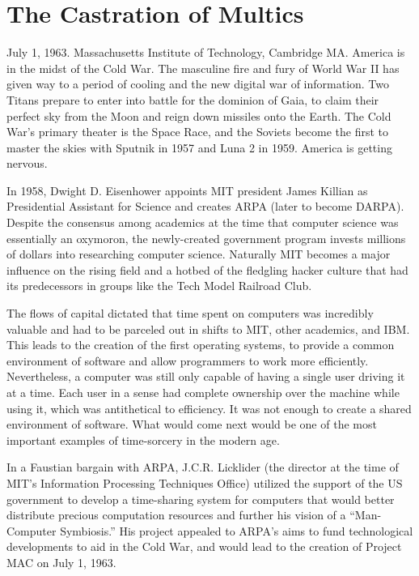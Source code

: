 \documentclass[10pt, statementpaper, twoside, openright]{memoir}
\begin{document}
\frontmatter
\pagestyle{simple}

\tableofcontents*

\mainmatter

\chapter{The Castration of Multics}

July 1, 1963. Massachusetts Institute of Technology, Cambridge MA. America is in the midst of the Cold War. The masculine fire and fury of World War II has given way to a period of cooling and the new digital war of information. Two Titans prepare to enter into battle for the dominion of Gaia, to claim their perfect sky from the Moon and reign down missiles onto the Earth. The Cold War's primary theater is the Space Race, and the Soviets become the first to master the skies with Sputnik in 1957 and Luna 2 in 1959. America is getting nervous.

In 1958, Dwight D. Eisenhower appoints MIT president James Killian as Presidential Assistant for Science and creates ARPA (later to become DARPA). Despite the consensus among academics at the time that computer science was essentially an oxymoron, the newly-created government program invests millions of dollars into researching computer science. Naturally MIT becomes a major influence on the rising field and a hotbed of the fledgling hacker culture that had its predecessors in groups like the Tech Model Railroad Club.

The flows of capital dictated that time spent on computers was incredibly valuable and had to be parceled out in shifts to MIT, other academics, and IBM. This leads to the creation of the first operating systems, to provide a common environment of software and allow programmers to work more efficiently. Nevertheless, a computer was still only capable of having a single user driving it at a time. Each user in a sense had complete ownership over the machine while using it, which was antithetical to efficiency. It was not enough to create a shared environment of software. What would come next would be one of the most important examples of time-sorcery in the modern age.

In a Faustian bargain with ARPA, J.C.R. Licklider (the director at the time of MIT's Information Processing Techniques Office) utilized the support of the US government to develop a time-sharing system for computers that would better distribute precious computation resources and further his vision of a ``Man-Computer Symbiosis.'' His project appealed to ARPA's aims to fund technological developments to aid in the Cold War, and would lead to the creation of Project MAC on July 1, 1963.
\end{document}
